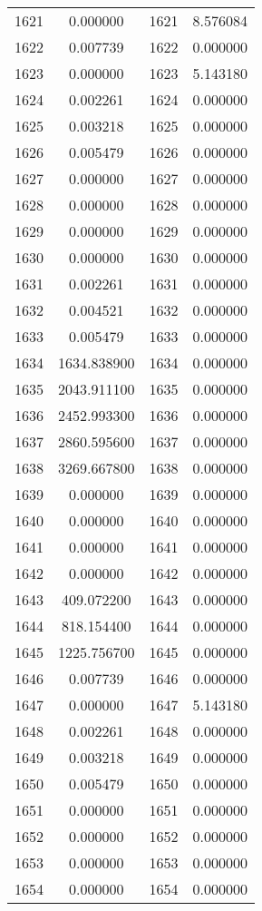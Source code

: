 \documentclass[12pt]{article}
\begin{document}
\begin{longtable}{@{}cccc@{}}
1621 & 0.000000 & 1621 & 8.576084 \\
1622 & 0.007739 & 1622 & 0.000000 \\
1623 & 0.000000 & 1623 & 5.143180 \\
1624 & 0.002261 & 1624 & 0.000000 \\
1625 & 0.003218 & 1625 & 0.000000 \\
1626 & 0.005479 & 1626 & 0.000000 \\
1627 & 0.000000 & 1627 & 0.000000 \\
1628 & 0.000000 & 1628 & 0.000000 \\
1629 & 0.000000 & 1629 & 0.000000 \\
1630 & 0.000000 & 1630 & 0.000000 \\
1631 & 0.002261 & 1631 & 0.000000 \\
1632 & 0.004521 & 1632 & 0.000000 \\
1633 & 0.005479 & 1633 & 0.000000 \\
1634 & 1634.838900 & 1634 & 0.000000 \\
1635 & 2043.911100 & 1635 & 0.000000 \\
1636 & 2452.993300 & 1636 & 0.000000 \\
1637 & 2860.595600 & 1637 & 0.000000 \\
1638 & 3269.667800 & 1638 & 0.000000 \\
1639 & 0.000000 & 1639 & 0.000000 \\
1640 & 0.000000 & 1640 & 0.000000 \\
1641 & 0.000000 & 1641 & 0.000000 \\
1642 & 0.000000 & 1642 & 0.000000 \\
1643 & 409.072200 & 1643 & 0.000000 \\
1644 & 818.154400 & 1644 & 0.000000 \\
1645 & 1225.756700 & 1645 & 0.000000 \\
1646 & 0.007739 & 1646 & 0.000000 \\
1647 & 0.000000 & 1647 & 5.143180 \\
1648 & 0.002261 & 1648 & 0.000000 \\
1649 & 0.003218 & 1649 & 0.000000 \\
1650 & 0.005479 & 1650 & 0.000000 \\
1651 & 0.000000 & 1651 & 0.000000 \\
1652 & 0.000000 & 1652 & 0.000000 \\
1653 & 0.000000 & 1653 & 0.000000 \\
1654 & 0.000000 & 1654 & 0.000000 \\

\end{longtable}
\end{document}
